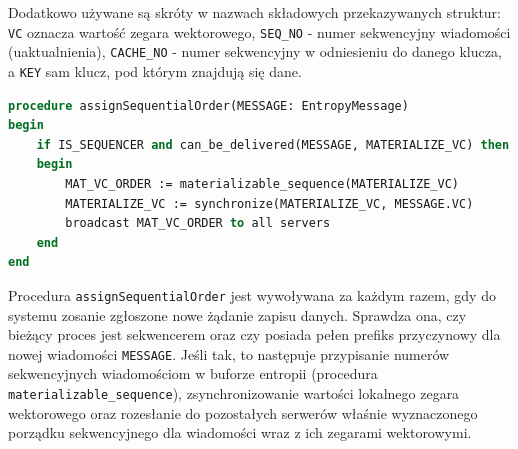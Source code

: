 Dodatkowo używane są skróty w nazwach składowych przekazywanych struktur: \texttt{VC} oznacza wartość zegara wektorowego, \texttt{SEQ\_NO} - numer sekwencyjny wiadomości (uaktualnienia), \texttt{CACHE\_NO} - numer sekwencyjny w odniesieniu do danego klucza, a \texttt{KEY} sam klucz, pod którym znajdują się dane.

\begin{lstlisting}[language=Pascal, caption=Pseudokod procedury próbującej dokonać sekwencjonowania w procesie sekwencera, mathescape=true]
procedure assignSequentialOrder(MESSAGE: EntropyMessage)
begin
    if IS_SEQUENCER and can_be_delivered(MESSAGE, MATERIALIZE_VC) then
    begin
        MAT_VC_ORDER := materializable_sequence(MATERIALIZE_VC)
        MATERIALIZE_VC := synchronize(MATERIALIZE_VC, MESSAGE.VC)
        broadcast MAT_VC_ORDER to all servers
    end
end
\end{lstlisting}

Procedura \texttt{assignSequentialOrder} jest wywoływana za każdym razem, gdy do systemu zosanie zgłoszone nowe żądanie zapisu danych. Sprawdza ona, czy bieżący proces jest sekwencerem oraz czy posiada pełen prefiks przyczynowy dla nowej wiadomości \texttt{MESSAGE}. Jeśli tak, to następuje przypisanie numerów sekwencyjnych wiadomościom w buforze entropii (procedura \texttt{materializable\_sequence}), zsynchronizowanie wartości lokalnego zegara wektorowego oraz rozesłanie do pozostałych serwerów właśnie wyznaczonego porządku sekwencyjnego dla wiadomości wraz z ich zegarami wektorowymi.

